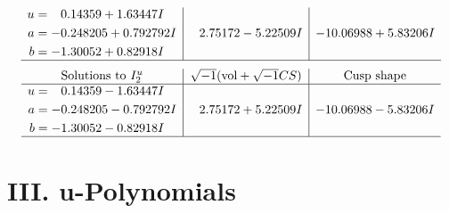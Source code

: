 \documentclass[1p]{elsarticle_modified}
\theoremstyle{definition}
\newcommand{\I}{\sqrt{-1}}
\begin{document}
$$\begin{array}{c|c|c}
\begin{aligned}
u &= \phantom{-}0.14359 + 1.63447 I \\
a &= -0.248205 + 0.792792 I \\
b &= -1.30052 + 0.82918 I\end{aligned}
 & \phantom{-}2.75172 - 5.22509 I & -10.06988 + 5.83206 I\\
 \hline 
 \end{array}$$\newpage$$\begin{array}{c|c|c}  
\text{Solutions to }I^u_{2}& \I (\text{vol} + \sqrt{-1}CS) & \text{Cusp shape}\\
 \hline 
\begin{aligned}
u &= \phantom{-}0.14359 - 1.63447 I \\
a &= -0.248205 - 0.792792 I \\
b &= -1.30052 - 0.82918 I\end{aligned}
 & \phantom{-}2.75172 + 5.22509 I & -10.06988 - 5.83206 I\\
 \hline 
 \end{array}$$\newpage
\newpage\renewcommand{\arraystretch}{1}
\centering \section*{ III. u-Polynomials}
\end{document}

